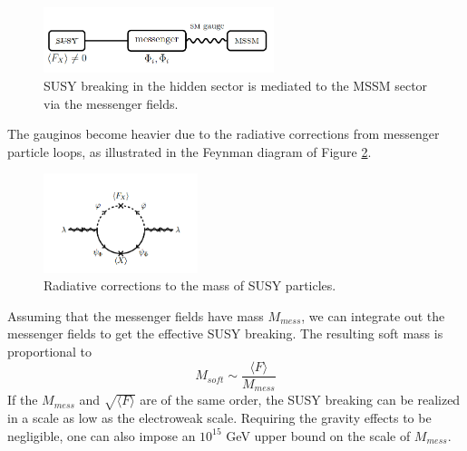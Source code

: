 \documentclass[thesis.tex]{subfiles}
\begin{document}
	\begin{figure}[!h]
		\centering
		\includegraphics[width=0.6\textwidth]{plot/GMSB.png}
		\caption{SUSY breaking in the hidden sector is mediated to the MSSM sector via the messenger fields.}
		\label{fig:GMSB}
	\end{figure}

The gauginos become heavier due to the radiative corrections from messenger particle loops, as illustrated in the Feynman diagram of Figure \ref{fig:messanger}. 

\begin{figure}[!h]
	\centering
		\includegraphics[width=0.4\textwidth]{plot/mess.png}
	\caption{Radiative corrections to the mass of SUSY particles.}
	\label{fig:messanger}
\end{figure}

Assuming that the messenger fields have mass $M_{mess}$, we can integrate out the messenger fields to get the effective SUSY breaking. 
The resulting soft mass is proportional to
	\begin{equation}
		M_{soft} \sim \frac{ \langle F \rangle}{M_{mess}}
	\end{equation}
If the $M_{mess}$ and $\sqrt{\langle F \rangle}$ are of the same order, the SUSY breaking can be realized in a scale as low as the electroweak scale. 
Requiring the gravity effects to be negligible, one can also impose an $10^{15}$ GeV upper bound on the scale of $M_{mess}$. \\
\end{document}
